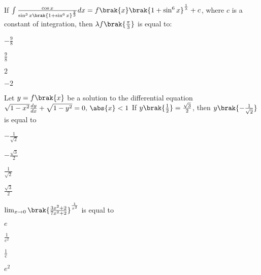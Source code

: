 \iffalse
\title{MA - 2020}
\author{EE24Btech11024}
\section{mcq-single}
\fi

\item If $\int \frac{\cos x}{\sin^{3}x\brak{1+\sin^{6}x}^{\frac{2}{3}}}dx = f\brak{x}\brak{1+\sin^{6}x}^{\frac{1}{\lambda}}+c$, where $c$ is a constant of integration, then $\lambda f\brak{\frac{\pi}{3}}$ is equal to:

\hfill{}
\begin{enumerate}
\begin{multicols}{4}
\item $-\frac{9}{8}$
\item $\frac{9}{8}$
\item $2$
\item $-2$
\end{multicols}
\end{enumerate}

\item Let $y=f\brak{x}$ be a solution to the differential equation $\sqrt{1-x^2}\frac{dy}{dx}+\sqrt{1-y^2} = 0 \text{, } \abs{x}<1$ If $y\brak{\frac{1}{2}} = \frac{\sqrt{3}}{2}$, then $y\brak{-\frac{1}{\sqrt{2}}}$ is equal to

\hfill{}
\begin{enumerate}
\begin{multicols}{4}
\item $-\frac{1}{\sqrt{2}}$
\item $-\frac{\sqrt{3}}{2}$
\item $\frac{1}{\sqrt{2}}$
\item $\frac{\sqrt{3}}{2}$
\end{multicols}
\end{enumerate}

\item $\lim_{x\to 0}\brak{\frac{3x^2+2}{7x^2+2}}^{\frac{1}{x^2}}$ is equal to

\hfill{}
\begin{enumerate}
\begin{multicols}{4}
\item $e$
\item $\frac{1}{e^2}$
\item $\frac{1}{e}$
\item $e^2$
\end{multicols}
\end{enumerate}


